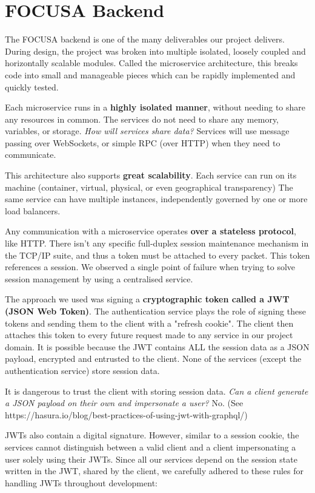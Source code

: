 \section{FOCUSA Backend}

The FOCUSA backend is one of the many deliverables our project delivers.
During design, the project was broken into multiple isolated, loosely coupled and horizontally scalable modules. 
Called the microservice architecture, this breaks code into small and manageable pieces which can be rapidly implemented and quickly tested.

Each microservice runs in a \textbf{highly isolated manner}, without needing to share any resources in common. The services do not need to share any memory, variables, or storage. 
\emph{How will services share data?} 
Services will use message passing over WebSockets, or simple RPC (over HTTP) when they need to communicate.

This architecture also supports \textbf{great scalability}. Each service can run on its machine (container, virtual, physical, or 
even geographical transparency) 
The same service can have multiple instances, independently governed by one or more load balancers.

Any communication with a microservice operates \textbf{over a stateless protocol}, like HTTP.
There isn't any specific full-duplex session maintenance mechanism in the TCP/IP suite, and thus a token must be attached to every packet. This token references a session. We observed a single point of failure when trying to solve session management by using a centralised service.

The approach we used was signing a \textbf{cryptographic token called a JWT (JSON Web Token)}. 
The authentication service plays the role of signing these tokens and sending them to the client with a "refresh cookie". The client then attaches this token to every future request made to any service in our project domain. It is possible because the JWT contains 
ALL the session data as a JSON payload, encrypted and entrusted to the client. None of the services (except the authentication service) store session data.

It is dangerous to trust the client with storing session data. \emph{Can a client generate a JSON payload on their own and impersonate a user?} No. (See https://hasura.io/blog/best-practices-of-using-jwt-with-graphql/)

JWTs also contain a digital signature. However, similar to a session cookie, the services cannot distinguish between a valid client and a client impersonating a user solely using their JWTs. Since all our services depend on the session state written in the JWT, shared by the client, we carefully adhered to these rules for handling JWTs throughout development:

